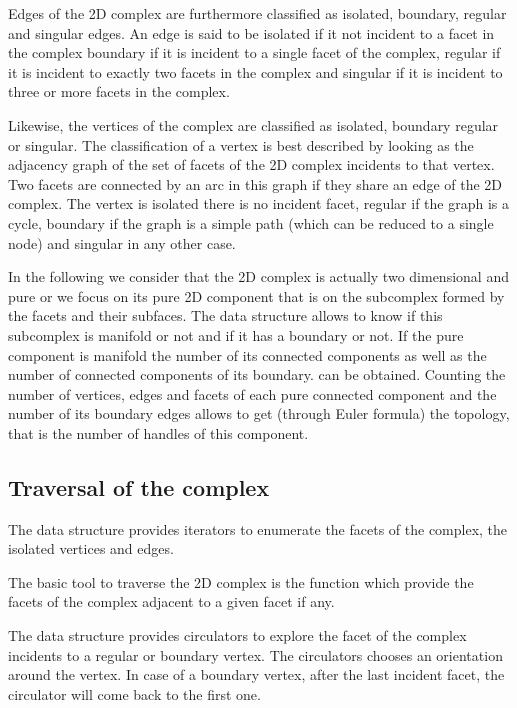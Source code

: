 Edges of the 2D complex  are furthermore  classified 
as isolated, boundary, regular and singular edges. An edge is said
to be  isolated if it not incident to a facet in the complex
boundary if it is incident to a single facet of the complex,
regular if it is incident to exactly two facets in the complex  and 
singular if it is incident to three or more facets in the complex.

Likewise, the vertices of the complex are classified as  isolated, boundary
regular or singular.  The classification of a vertex is best
described by looking  as the adjacency graph of the set 
of facets of the 2D complex
incidents to that vertex. 
Two facets are connected by an arc in this graph if
they share an edge of the 2D complex. The vertex is isolated
there is no incident facet, regular  if the graph is a cycle,
boundary if the graph is a simple path (which can be reduced to a
single node) and singular in any other case.

In the following we consider that the 2D complex is 
actually two dimensional and pure or we focus
on its pure 2D component 
that is on  the subcomplex formed by the facets and
their subfaces.
The data structure allows to know if this subcomplex is manifold or not
and if it has a boundary or not.  If the pure component is manifold
the number of its connected components as well
as the number of connected components of its boundary.
can be obtained. 
Counting the number of vertices, edges and
facets of each  pure connected component  and the number
of its boundary edges allows to get
 (through Euler formula)
the  topology, that is the number of handles of this component.

 

\subsection{Traversal of the complex}
The data structure provides iterators to enumerate 
the facets of the complex, the isolated vertices and edges.

The basic tool to traverse the 2D  complex is the 
function which provide the facets of the complex adjacent to  a given
facet if any.

The data structure provides circulators to explore the facet of the
complex incidents to a regular or boundary vertex. The circulators 
chooses an orientation around the vertex. In case of a boundary vertex,
after the last incident facet, the circulator will
come back to the first one.

